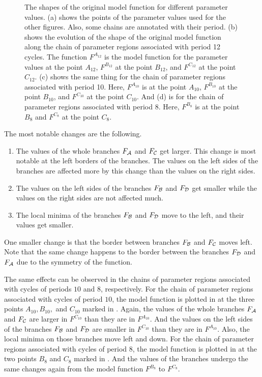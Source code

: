 \begin{figure}
{		\label{fig:setup.char.evolution.08}
	}
	\caption[Effects of parameters on the original model function]{
		The shapes of the original model function for different parameter values.
		(a) shows the points of the parameter values used for the other figures.
		Also, some chains are annotated with their period.
		(b) shows the evolution of the shape of the original model function along the chain of parameter regions associated with period 12 cycles.
		The function $F^{A_{12}}$ is the model function for the parameter values at the point $A_{12}$, $F^{B_{12}}$ at the point $B_{12}$, and $F^{C_{12}}$ at the point $C_{12}$.
		(c) shows the same thing for the chain of parameter regions associated with period 10.
		Here, $F^{A_{10}}$ is at the point $A_{10}$, $F^{B_{10}}$ at the point $B_{10}$, and $F^{C_{10}}$ at the point $C_{10}$.
		And (d) is for the chain of parameter regions associated with period 8.
		Here, $F^{B_8}$ is at the point $B_8$ and $F^{C_8}$ at the point $C_8$.
	}
	\label{fig:setup.char.evolution.combined}
\end{figure}

The most notable changes are the following.
\begin{enumerate}
	\item The values of the whole branches $F_{\mathcal{A}}$ and $F_{\mathcal{C}}$ get larger.
	      This change is most notable at the left borders of the branches.
	      The values on the left sides of the branches are affected more by this change than the values on the right sides.
	\item The values on the left sides of the branches $F_{\mathcal{B}}$ and $F_{\mathcal{D}}$ get smaller while the values on the right sides are not affected much.
	\item The local minima of the branches $F_{\mathcal{B}}$ and $F_{\mathcal{D}}$ move to the left, and their values get smaller.
\end{enumerate}
One smaller change is that the border between branches $F_{\mathcal{B}}$ and $F_{\mathcal{C}}$ moves left.
Note that the same change happens to the border between the branches $F_{\mathcal{D}}$ and $F_{\mathcal{A}}$ due to the symmetry of the function.

The same effects can be observed in the chains of parameter regions associated with cycles of periods $10$ and $8$, respectively.
For the chain of parameter regions associated with cycles of period $10$, the model function is plotted in  at the three points $A_{10}, B_{10},$ and $C_{10}$ marked in .
Again, the values of the whole branches $F_{\mathcal{A}}$ and $F_{\mathcal{C}}$ are larger in $F^{C_{10}}$ than they are in $F^{A_{10}}$.
And the values on the left sides of the branches $F_{\mathcal{B}}$ and $F_{\mathcal{D}}$ are smaller in $F^{C_{10}}$ than they are in $F^{A_{10}}$.
Also, the local minima on those branches move left and down.
For the chain of parameter regions associated with cycles of period $8$, the model function is plotted in  at the two points $B_8$ and $C_8$ marked in .
And the values of the branches undergo the same changes again from the model function $F^{B_8}$ to $F^{C_8}$.

